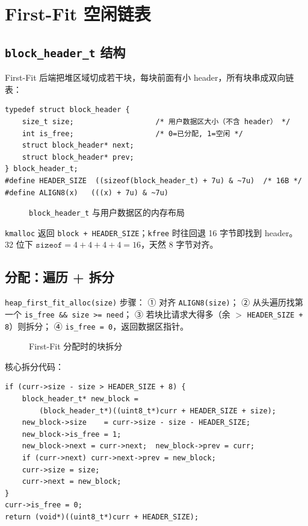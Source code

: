 \section{First-Fit 空闲链表}

\subsection{\texttt{block\_header\_t} 结构}

First-Fit 后端把堆区域切成若干块，每块前面有小 header，所有块串成双向链表：

\begin{lstlisting}[style=cstyle]
typedef struct block_header {
    size_t size;                   /* 用户数据区大小（不含 header） */
    int is_free;                   /* 0=已分配, 1=空闲 */
    struct block_header* next;
    struct block_header* prev;
} block_header_t;
#define HEADER_SIZE  ((sizeof(block_header_t) + 7u) & ~7u)  /* 16B */
#define ALIGN8(x)   (((x) + 7u) & ~7u)
\end{lstlisting}

\begin{figure}[H]
  \centering
  
  \caption{\texttt{block\_header\_t} 与用户数据区的内存布局}
  \label{fig:block-header-layout}
\end{figure}

\texttt{kmalloc} 返回 \texttt{block + HEADER\_SIZE}；\texttt{kfree} 时往回退 16 字节即找到 header。
32 位下 $\texttt{sizeof} = 4{+}4{+}4{+}4 = 16$，天然 8 字节对齐。

\subsection{分配：遍历 + 拆分}

\texttt{heap\_first\_fit\_alloc(size)} 步骤：
① 对齐 \texttt{ALIGN8(size)}；
② 从头遍历找第一个 \texttt{is\_free \&\& size >= need}；
③ 若块比请求大得多（余 $>$ \texttt{HEADER\_SIZE + 8}）则拆分；
④ \texttt{is\_free = 0}，返回数据区指针。

\begin{figure}[H]
  \centering
  
  \caption{First-Fit 分配时的块拆分}
  \label{fig:block-split}
\end{figure}

核心拆分代码：

\begin{lstlisting}[style=cstyle]
if (curr->size - size > HEADER_SIZE + 8) {
    block_header_t* new_block =
        (block_header_t*)((uint8_t*)curr + HEADER_SIZE + size);
    new_block->size    = curr->size - size - HEADER_SIZE;
    new_block->is_free = 1;
    new_block->next = curr->next;  new_block->prev = curr;
    if (curr->next) curr->next->prev = new_block;
    curr->size = size;
    curr->next = new_block;
}
curr->is_free = 0;
return (void*)((uint8_t*)curr + HEADER_SIZE);
\end{lstlisting}

